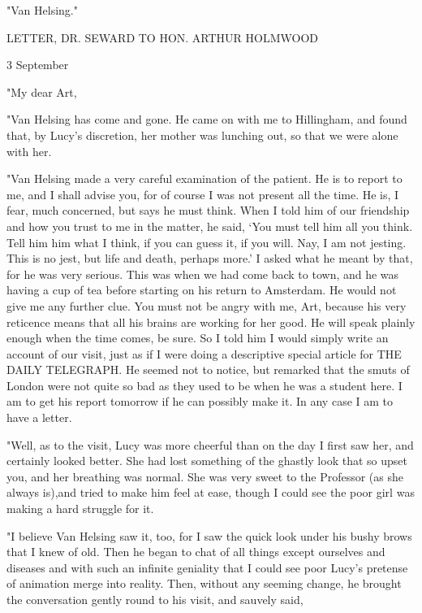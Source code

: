 "Van Helsing." 

LETTER, DR. SEWARD TO HON. ARTHUR HOLMWOOD 

3 September 

"My dear Art, 

"Van Helsing has come and gone. He came on with me to Hillingham, and found that, by Lucy's discretion, her mother was lunching out, so that we were alone with her. 

"Van Helsing made a very careful examination of the patient. He is to report to me, and I shall advise you, for of course I was not present all the time. He is, I fear, much concerned, but says he must think. When I told him of our friendship and how you trust to me in the matter, he said, `You must tell him all you think. Tell him him what I think, if you can guess it, if you will. Nay, I am not jesting. This is no jest, but life and death, perhaps more.' I asked what he meant by that, for he was very serious. This was when we had come back to town, and he was having a cup of tea before starting on his return to Amsterdam. He would not give me any further clue. You must not be angry with me, Art, because his very reticence means that all his brains are working for her good. He will speak plainly enough when the time comes, be sure. So I told him I would simply write an account of our visit, just as if I were doing a descriptive special article for THE DAILY TELEGRAPH. He seemed not to notice, but remarked that the smuts of London were not quite so bad as they used to be when he was a student here. I am to get his report tomorrow if he can possibly make it. In any case I am to have a letter. 

"Well, as to the visit, Lucy was more cheerful than on the day I first saw her, and certainly looked better. She had lost something of the ghastly look that so upset you, and her breathing was normal. She was very sweet to the Professor (as she always is),and tried to make him feel at ease, though I could see the poor girl was making a hard struggle for it. 

"I believe Van Helsing saw it, too, for I saw the quick look under his bushy brows that I knew of old. Then he began to chat of all things except ourselves and diseases and with such an infinite geniality that I could see poor Lucy's pretense of animation merge into reality. Then, without any seeming change, he brought the conversation gently round to his visit, and sauvely said, 

